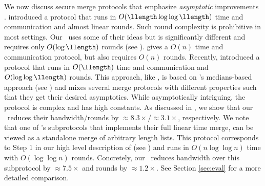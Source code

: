 We now discuss secure merge protocols that emphasize \emph{asymptotic} improvements \cite{ITC:FalOst21,CSCML:FalNemOst22,EPRINT:BBDLO22}.
\cite{ITC:FalOst21} introduced a protocol that runs in $O(\llength \log \log \llength)$ time and communication and almost linear rounds. %
Such round complexity is prohibitive in most settings. Our \ourapproach\ uses some of their ideas but is significantly different and requires only $O(\log\llength)$ rounds (see ). \cite{CSCML:FalNemOst22} gives a $O(n)$ time and communication protocol, but also requires $O(n)$ rounds.
Recently, \cite{EPRINT:BBDLO22} introduced a protocol that runs in $O(\llength)$ time and communication and $O(\log\log \llength)$ rounds. This approach, like \ourapproachtwo, is based on \cite{JC:Val75}'s medians-based approach (see ) and mixes several merge protocols with different properties such that they get their desired asymptotics. While asymptotically intriguing, the protocol is complex and has high constants. As discussed in , we show that our \ourapproach\ reduces their bandwidth/rounds by $\approx8.3\times$/$\approx3.1\times$, respectively. 
We note that one of \cite{EPRINT:BBDLO22}'s subprotocols that implements their full linear time merge, can be viewed as a standalone merge of arbitrary length lists. This protocol corresponds to Step 1 in our high level description of \cite{EPRINT:BBDLO22} (see ) and runs in $O(n\log\log n)$ time with $O(\log \log n)$ rounds. Concretely, our \ourapproach\ reduces bandwidth over this subprotocol by $\approx 7.5\times$ and rounds by $\approx 1.2\times$.
See Section \ref{sec:eval} for a more detailed comparison. %